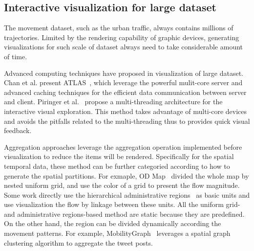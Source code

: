 \subsection{Interactive visualization for large dataset}
The movement dataset, such as the urban traffic, always contains millions of trajectories. Limited by the rendering capability of graphic devices, generating visualizations for such scale of dataset always need to take considerable amount of time. 

Advanced computing techniques have proposed in visualization of large dataset. Chan et al. present ATLAS~\cite{chan2008maintaining},  which leverage the powerful mulit-core server and advanced caching techniques for the efficient data communication between server and client.  Piringer et al.~\cite{piringer2009multi} propose a multi-threading architecture for the interactive visual exploration. This method takes advantage of multi-core devices and avoids the pitfalls related to the multi-threading thus to provides quick visual feedback.  

Aggregation approaches leverage the aggregation operation implemented before visualization to reduce the items will be rendered. Specifically for the spatial temporal data, these method can be further categoried according to how to generate the spatial partitions. For exmaple, OD Map~\cite{wood2010visualisation} divided the whole map by nested uniform grid, and use the color of a grid to present the flow magnitude.     
Some work directly use the hierarchical administrative regions~\cite{guo2009flow} as basic units and use visualization the flow by linkage between these units. All the uniform grid- and administrative regions-based method are static because they are predefined. On the other hand, the region can be divided dynamically according the movement patterns. For example, MobilityGraph~\cite{von2015mobilitygraphs} leverages a spatial graph clustering algorithm to aggregate the tweet posts. 



